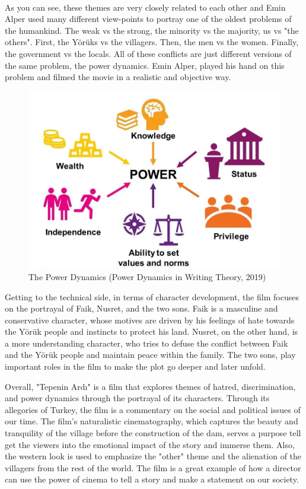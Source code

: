 \documentclass[12pt]{article}
\begin{document}
\\
As you can see, these themes are very closely related to each other and Emin Alper used many different view-points to portray one of the oldest problems of the humankind. The weak vs the strong, the minority vs the majority, us vs "the others". First, the Yörüks vs the villagers. Then, the men vs the women. Finally, the government vs the locals. All of these conflicts are just different versions of the same problem, the power dynamics. Emin Alper, played his hand on this problem and filmed the movie in a realistic and objective way.

\begin{figure}[h]
        \begin{center}
                \includegraphics[width=120mm,scale=0.5]{power}
                \caption{The Power Dynamics (Power Dynamics in Writing Theory, 2019)}
        \end{center}
\end{figure}

\FloatBarrier

\par
Getting to the technical side, in terms of character development, the film focuses on the portrayal of Faik, Nusret, and the two sons. Faik is a masculine and conservative character, whose motives are driven by his feelings of hate towards the Yörük people and instincts to protect his land. Nusret, on the other hand, is a more understanding character, who tries to defuse the conflict between Faik and the Yörük people and maintain peace within the family. The two sons, play important roles in the film to make the plot go deeper and later unfold.
\\
\par
Overall, "Tepenin Ardı" is a film that explores themes of hatred, discrimination, and power dynamics through the portrayal of its characters. Through its allegories of Turkey, the film is a commentary on the social and political issues of our time. The film's naturalistic cinematography, which captures the beauty and tranquility of the village before the construction of the dam, serves a purpose tell get the viewers into the emotional impact of the story and immerse them. Also, the western look is used to emphasize the "other" theme and the alienation of the villagers from the rest of the world. The film is a great example of how a director can use the power of cinema to tell a story and make a statement on our society.
\end{document}
